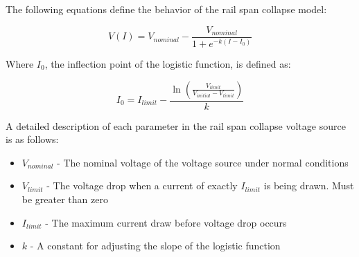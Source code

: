 \documentclass[conference]{IEEEtran}
\begin{document}
    The following equations define the behavior of the rail span collapse model:

    \begin{equation}
        V(I) = V_{nominal} - \frac{V_{nominal}}{1 + e^{-k(I - I_0)}}
        \label{eq:VI}
    \end{equation}

    Where \(I_0\), the inflection point of the logistic function, is defined as:

    \begin{equation}
        I_0 = I_{limit} - \frac{\ln\left(\frac{V_{limit}}{V_{initial} - V_{limit}}\right)}{k}
        \label{eq:I0}
    \end{equation}

    A detailed description of each parameter in the rail span collapse voltage source is as follows:

    \begin{itemize}

        \item[] \(V_{nominal}\) - The nominal voltage of the voltage source under normal conditions

        \item[] \(V_{limit}\) - The voltage drop when a current of exactly \(I_{limit}\) is being drawn.
        Must be greater than zero

        \item[] \(I_{limit}\) - The maximum current draw before voltage drop occurs

        \item[] \(k\) - A constant for adjusting the slope of the logistic function

    \end{itemize}

%

\end{document}
